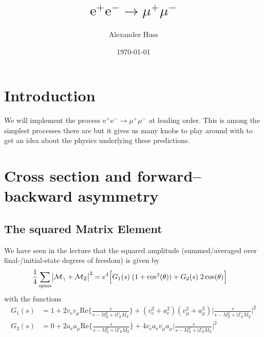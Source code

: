 \documentclass[11pt]{article}
\author{Alexander Huss}
\date{\today}
\title{\(\mathrm{e}^+\mathrm{e}^- \to \mu^+ \mu^-\)}
\begin{document}
\maketitle
\tableofcontents



\section{Introduction}
\label{sec:org9ed01a9}
We will implement the process \(\mathrm{e}^+\mathrm{e}^- \to \mu^+ \mu^-\) at leading order.
This is among the simplest processes there are but it gives us many knobs to play around with to get an idea about the physics underlying these predictions.

\section{Cross section and forward--backward asymmetry}
\label{sec:org5a0682b}

\subsection{The squared Matrix Element}
\label{sec:orgac2e2c2}
We have seen in the lecture that the squared amplitude (summed/averaged over final-/initial-state degrees of freedom) is given by
\begin{align}
  \frac{1}{4} \sum_\text{spins}
  \bigl\lvert \mathcal{M}_\gamma + \mathcal{M}_\mathrm{Z} \bigr\rvert^2
  &=
  e^4 \Bigl[ G_1(s)\; (1+\cos^2(\theta)) + G_2(s)\; 2 \cos(\theta) \Bigr]
\end{align}
with the functions
\begin{align*}
  G_1(s) &=
  1
  + 2 v_\mathrm{e} v_\mu \mathrm{Re}\biggl\{\frac{s}{s - M_\mathrm{Z}^2 + \mathrm{i}\Gamma_\mathrm{Z}M_\mathrm{Z}}\biggr\}
  + (v_\mathrm{e}^2 + a_\mathrm{e}^2) (v_\mu^2 + a_\mu^2) \biggl\lvert\frac{s}{s - M_\mathrm{Z}^2 + \mathrm{i}\Gamma_\mathrm{Z}M_\mathrm{Z}}\biggr\rvert^2
  \\
  G_2(s) &=
  0
  + 2 a_\mathrm{e} a_\mu \mathrm{Re}\biggl\{\frac{s}{s - M_\mathrm{Z}^2 + \mathrm{i}\Gamma_\mathrm{Z}M_\mathrm{Z}}\biggr\}
  + 4 v_\mathrm{e} a_\mathrm{e} v_\mu a_\mu \biggl\lvert\frac{s}{s - M_\mathrm{Z}^2 + \mathrm{i}\Gamma_\mathrm{Z}M_\mathrm{Z}}\biggr\rvert^2
\end{align*}
\end{document}
